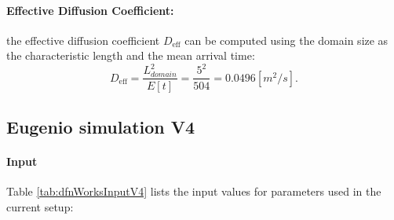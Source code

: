 \documentclass{article}
\begin{document}
\paragraph{Effective Diffusion Coefficient:} the effective diffusion coefficient \( D_{\text{eff}} \) can be computed using the domain size as the characteristic length and the mean arrival time:
\[ D_{\text{eff}} = \frac{L_{domain}^2}{E[t]} = \frac{5^2}{504} = 0.0496 [m^2/s]. \]

\FloatBarrier  %
\subsection{Eugenio simulation V4}
\paragraph{Input} Table \ref{tab:dfnWorksInputV4} lists the input values for parameters used in the current setup: 
\end{document}
